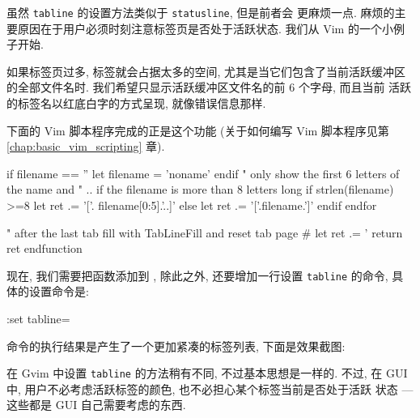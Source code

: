 虽然 \texttt{tabline} 的设置方法类似于 \texttt{statusline}, 但是前者会
更麻烦一点. 麻烦的主要原因在于用户必须时刻注意标签页是否处于活跃状态.
我们从 Vim 的一个小例子开始.

如果标签页过多, 标签就会占据太多的空间, 尤其是当它们包含了当前活跃缓冲区
的全部文件名时. 我们希望只显示活跃缓冲区文件名的前 6 个字母, 而且当前
活跃的标签名以红底白字的方式呈现, 就像错误信息那样.

下面的 Vim 脚本程序完成的正是这个功能 (关于如何编写 Vim 脚本程序见第
\ref{chap:basic_vim_scripting} 章).
\begin{vimscript}
    if filename == ''
      let filename = 'noname'
    endif
    " only show the first 6 letters of the name  and
    " .. if the filename is more than 8 letters long
    if strlen(filename) >=8
        let ret .= '['. filename[0:5].'..]'
    else
         let ret .= '['.filename.']'
    endif
 endfor

 " after the last tab fill with TabLineFill and reset tab page #
  let ret .= '%
  return ret
endfunction
\end{vimscript}

现在, 我们需要把函数添加到 , 除此之外, 还要增加一行设置
\texttt{tabline} 的命令, 具体的设置命令是:
\begin{vimcmd}
:set tabline=%
\end{vimcmd}
命令的执行结果是产生了一个更加紧凑的标签列表, 下面是效果截图:
\begin{center}
\end{center}

在 Gvim 中设置 \texttt{tabline} 的方法稍有不同, 不过基本思想是一样的. 不过,
在 GUI 中, 用户不必考虑活跃标签的颜色, 也不必担心某个标签当前是否处于活跃
状态 --- 这些都是 GUI 自己需要考虑的东西.

